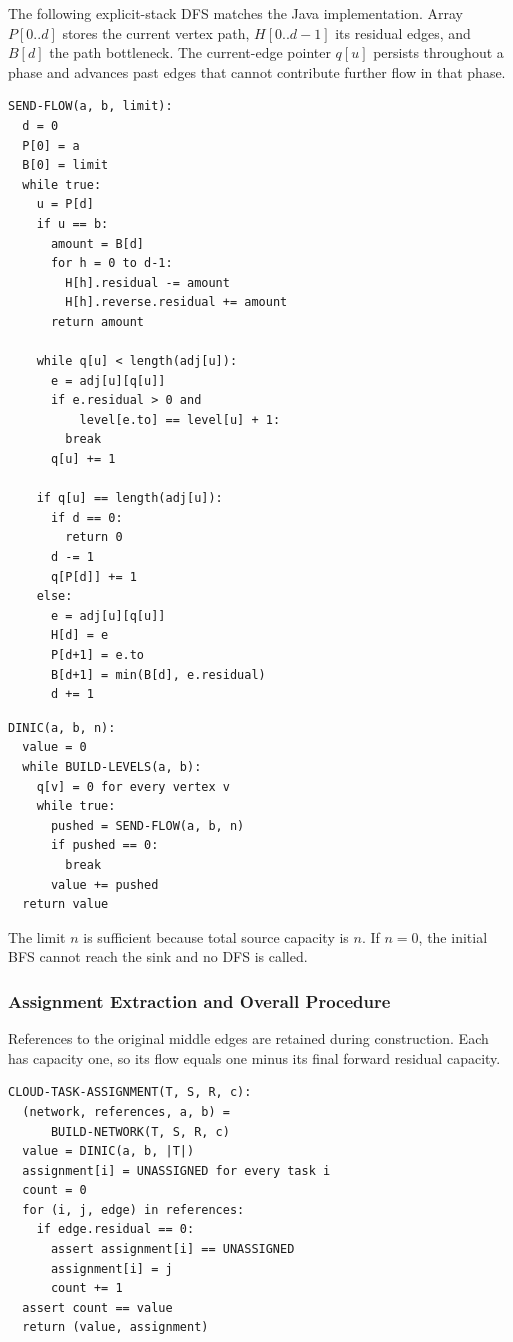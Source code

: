 \documentclass[conference]{IEEEtran}
\theoremstyle{definition}
\theoremstyle{remark}
\begin{document}
The following explicit-stack DFS matches the Java implementation. Array
$P[0..d]$ stores the current vertex path, $H[0..d-1]$ its residual edges,
and $B[d]$ the path bottleneck. The current-edge pointer $q[u]$ persists
throughout a phase and advances past edges that cannot contribute further
flow in that phase.

\begin{lstlisting}[caption={Iterative DFS augmentation in one level graph.}]
SEND-FLOW(a, b, limit):
  d = 0
  P[0] = a
  B[0] = limit
  while true:
    u = P[d]
    if u == b:
      amount = B[d]
      for h = 0 to d-1:
        H[h].residual -= amount
        H[h].reverse.residual += amount
      return amount

    while q[u] < length(adj[u]):
      e = adj[u][q[u]]
      if e.residual > 0 and
          level[e.to] == level[u] + 1:
        break
      q[u] += 1

    if q[u] == length(adj[u]):
      if d == 0:
        return 0
      d -= 1
      q[P[d]] += 1
    else:
      e = adj[u][q[u]]
      H[d] = e
      P[d+1] = e.to
      B[d+1] = min(B[d], e.residual)
      d += 1
\end{lstlisting}

\begin{lstlisting}[caption={Dinic maximum flow.}]
DINIC(a, b, n):
  value = 0
  while BUILD-LEVELS(a, b):
    q[v] = 0 for every vertex v
    while true:
      pushed = SEND-FLOW(a, b, n)
      if pushed == 0:
        break
      value += pushed
  return value
\end{lstlisting}
The limit $n$ is sufficient because total source capacity is $n$. If
$n=0$, the initial BFS cannot reach the sink and no DFS is called.

\subsubsection{Assignment Extraction and Overall Procedure}
References to the original middle edges are retained during construction.
Each has capacity one, so its flow equals one minus its final forward
residual capacity.

\begin{lstlisting}[caption={Complete assignment algorithm.}]
CLOUD-TASK-ASSIGNMENT(T, S, R, c):
  (network, references, a, b) =
      BUILD-NETWORK(T, S, R, c)
  value = DINIC(a, b, |T|)
  assignment[i] = UNASSIGNED for every task i
  count = 0
  for (i, j, edge) in references:
    if edge.residual == 0:
      assert assignment[i] == UNASSIGNED
      assignment[i] = j
      count += 1
  assert count == value
  return (value, assignment)
\end{lstlisting}
\end{document}
